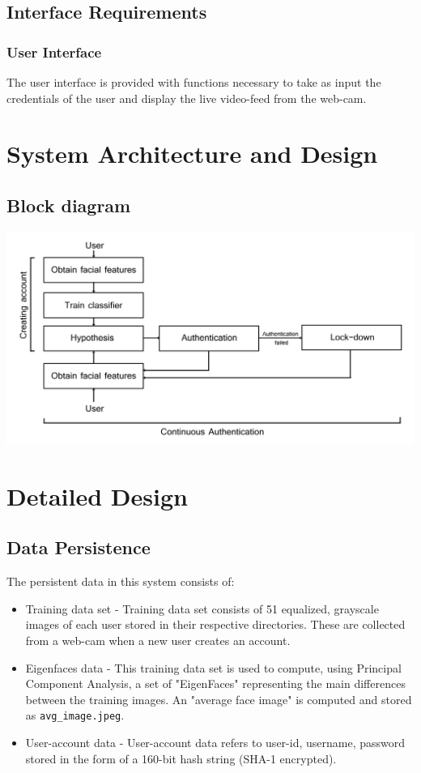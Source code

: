 \documentclass[12pt]{article}			%
\begin{document}
\subsection{ Interface Requirements }
\subsubsection{ User Interface }
The user interface is provided with functions necessary to take as input the credentials of the user and display the live video-feed from the web-cam.

\section{ System Architecture and Design }  
\subsection{ Block diagram }
\begin{center}
    \includegraphics[scale=0.8]{block.png}
\end{center}

\section{ Detailed Design }
\subsection{ Data Persistence }
The persistent data in this system consists of:
\begin{itemize}
\item Training data set - Training data set consists of 51 equalized, grayscale images of each user stored in their respective directories. These are collected from a web-cam when a new user creates an account.%
\item Eigenfaces data - This training data set is used to compute, using Principal Component Analysis, a set of "EigenFaces" representing the main differences between the training images. An "average face image" is computed and stored as \verb+avg_image.jpeg+. 
\item User-account data - User-account data refers to user-id, username, password stored in the form of a 160-bit hash string (SHA-1 encrypted).
\end{itemize}
\end{document}
